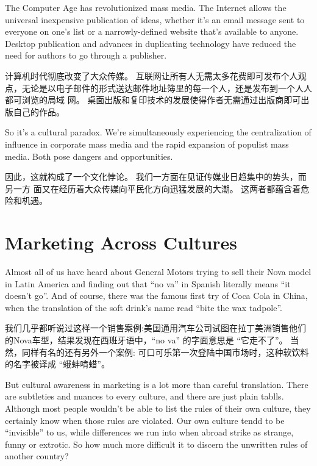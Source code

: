 \documentclass[cs4size, a4paper, 12pt]{article}
\newcounter{numpar}
\newcommand*{\newpar}{\numpar{}}
\begin{document}
	\newpar The Computer Age has revolutionized mass media. The Internet allows the universal inexpensive publication of ideas, whether it's an email message sent to everyone on one's list or a narrowly-defined website that's available to anyone. Desktop publication and advances in duplicating   technology have reduced the need for authors to go through a publisher. 
	
	计算机时代彻底改变了大众传媒。 互联网让所有人无需太多花费即可发布个人观点，无论是以电子邮件的形式送达邮件地址簿里的每一个人，还是发布到一个人人都可浏览的局域 网。 桌面出版和复印技术的发展使得作者无需通过出版商即可出版自己的作品。 
	
	\newpar So it's a cultural paradox. We're simultaneously experiencing the centralization of influence in corporate mass media and the rapid expansion of populist mass media. Both pose dangers and opportunities.
	
	因此，这就构成了一个文化悖论。 我们一方面在见证传媒业日趋集中的势头，而另一方 面又在经历着大众传媒向平民化方向迅猛发展的大潮。 这两者都蕴含着危险和机遇。 
	
	\section{ Marketing Across Cultures}
	\setcounter{numpar}{0}
	
	\newpar Almost all of us have heard about General Motors trying to sell their Nova model in Latin America and finding out that ``no va'' in Spanish literally means ``it doesn’t go''. And of course, there was the famous first try of Coca Cola in China, when the translation of the soft drink’s name read ``bite the wax tadpole''.
	
	我们几乎都听说过这样一个销售案例:美国通用汽车公司试图在拉丁美洲销售他们的Nova车型，结果发现在西班牙语中，``no va'' 的字面意思是 ``它走不了''。 当然，同样有名的还有另外一个案例: 可口可乐第一次登陆中国市场时，这种软饮料的名字被译成 ``蛾蚌啃蜡''。  
	
	\newpar But cultural awareness in marketing is a lot more than careful translation. There are subtleties and nuances to every culture, and there are just plain tablls. Although most people wouldn’t be able to list the rules of their own culture, they certainly know when those rules are violated. Our own culture tendd to be ``invisible'' to us, while differences we run into when abroad strike as strange, funny or extrotic. So how much more difficult it to discern the unwritten rules of another country?
	
\end{document}
